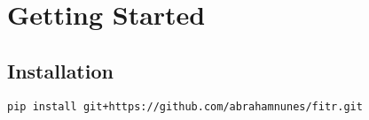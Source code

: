 \hypertarget{getting-started}{%
\section{Getting Started}\label{getting-started}}

\hypertarget{installation}{%
\subsection{Installation}\label{installation}}

\begin{verbatim}
pip install git+https://github.com/abrahamnunes/fitr.git
\end{verbatim}
